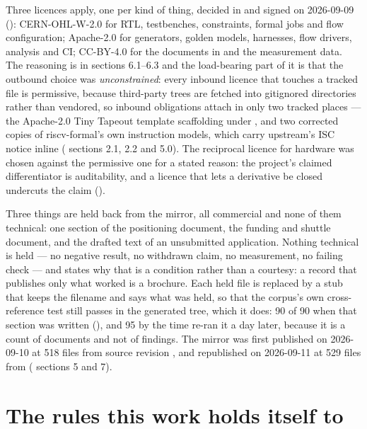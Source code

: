 \begin{sloppypar}
Three licences apply, one per kind of thing, decided in  and
signed on 2026-09-09 (): CERN-OHL-W-2.0 for RTL,
testbenches, constraints, formal jobs and flow configuration;
Apache-2.0 for generators, golden models, harnesses, flow drivers,
analysis and CI; CC-BY-4.0 for the documents in  and the
measurement data. The reasoning is in  sections 6.1--6.3 and
the load-bearing part of it is that the outbound choice was
\emph{unconstrained}: every inbound licence that touches a tracked file
is permissive, because third-party trees are fetched into gitignored
directories rather than vendored, so inbound obligations attach in only
two tracked places --- the Apache-2.0 Tiny Tapeout template scaffolding
under , and two corrected copies of riscv-formal's own
instruction models, which carry upstream's ISC notice inline
( sections 2.1, 2.2 and 5.0). The reciprocal licence for
hardware was chosen against the permissive one for a stated reason:
the project's claimed differentiator is auditability, and a licence that
lets a derivative be closed undercuts the claim
().
\end{sloppypar}

Three things are held back from the mirror, all commercial and none of
them technical: one section of the positioning document, the funding and
shuttle document, and the drafted text of an unsubmitted application.
Nothing technical is held --- no negative result, no withdrawn claim, no
measurement, no failing check --- and  states why
that is a condition rather than a courtesy: a record that publishes only
what worked is a brochure. Each held file is replaced by a stub that
keeps the filename and says what was held, so that the corpus's own
cross-reference test still passes in the generated tree, which it does:
90 of 90 when that section was written (), and 95
by the time  re-ran it a day later, because it is a
count of documents and not of findings. The mirror was first published on
2026-09-10 at 518 files from source revision , and
republished on 2026-09-11 at 529 files from 
( sections 5 and 7).

\section{The rules this work holds itself to}
\label{sec:intro-rules}

